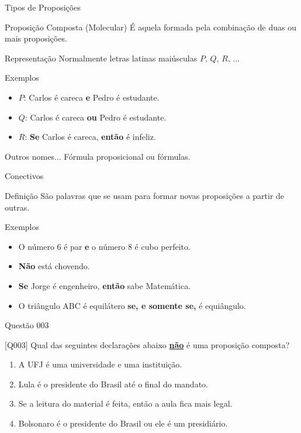 \documentclass[xcolor=dvipsnames,table]{beamer}
\begin{document}
	\begin{frame}{Tipos de Proposições}
		\begin{block}{Proposição Composta (Molecular)}
			É aquela formada pela combinação de duas ou mais proposições.
		\end{block} \pause
		\begin{block}{Representação}
			Normalmente letras latinas maiúsculas $P$, $Q$, $R$, ...
		\end{block} \pause
		\begin{exampleblock}{Exemplos}
			\begin{itemize}[label=-]
				\item $P$: Carlos é careca {\bf e} Pedro é estudante.
				\item $Q$: Carlos é careca {\bf ou} Pedro é estudante.
				\item $R$: {\bf Se} Carlos é careca, {\bf então} é infeliz.
			\end{itemize}
		\end{exampleblock} \pause
		\begin{block}{Outros nomes...}
			Fórmula proposicional ou fórmulas.
		\end{block}
	\end{frame}

	\begin{frame}{Conectivos}
		\begin{block}{Definição}
			São palavras que se usam para formar novas proposições a partir de outras.
		\end{block} \pause
		\begin{exampleblock}{Exemplos} \pause
			\begin{itemize}[label=-]
				\item O número 6 é par {\bf e} o número 8 é cubo perfeito. \pause
				\item {\bf Não} está chovendo. \pause
				\item {\bf Se} Jorge é engenheiro, {\bf então} sabe Matemática. \pause
				\item O triângulo ABC é equilátero {\bf se, e somente se,} é equiângulo.
			\end{itemize}
		\end{exampleblock}
	\end{frame}

	\begin{frame}{Questão 003}
	\begin{block}{[Q003]}
		Qual das seguintes declarações abaixo \underline{\bf não} é uma proposição composta?
	\end{block}
	\begin{enumerate}[label=(\Alph*)]
		\item A UFJ é uma universidade e uma instituição.
		\item Lula é o presidente do Brasil até o final do mandato.
		\item Se a leitura do material é feita, então a aula fica mais legal.
		\item Bolsonaro é o presidente do Brasil ou ele é um presidiário.
	\end{enumerate}
\end{frame}
\end{document}
